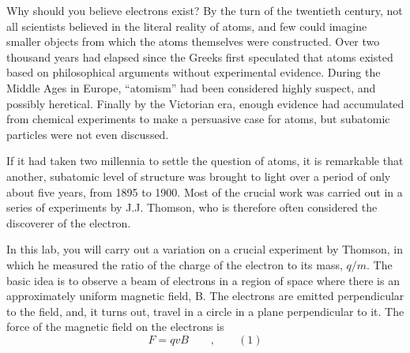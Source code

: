 \label{charge-to-mass}\label{lab:charge-to-mass}



\apparatus
{}


\introduction

Why should you believe electrons exist? By the turn of the
twentieth century, not all scientists believed in the
literal reality of atoms, and few could imagine smaller
objects from which the atoms themselves were constructed.
Over two thousand years had elapsed since the Greeks first
speculated that atoms existed based on philosophical
arguments without experimental evidence. During the Middle
Ages in Europe, ``atomism'' had been considered highly
suspect, and possibly heretical. Finally by the Victorian
era, enough evidence had accumulated from chemical
experiments to make a persuasive case for atoms, but
subatomic particles were not even discussed.

If it had taken two millennia to settle the question of
atoms, it is remarkable that another, subatomic level of
structure was brought to light over a period of only about
five years, from 1895 to 1900. Most of the crucial work was
carried out in a series of experiments by J.J. Thomson, who
is therefore often considered the discoverer of the electron.


In this lab, you will carry out a variation on a crucial
experiment by Thomson, in which he measured the ratio of the
charge of the electron to its mass, $q/m$. The basic idea is
to observe a beam of electrons in a region of space where
there is an approximately uniform magnetic field, B. The
electrons are emitted perpendicular to the field, and, it
turns out, travel in a circle in a plane perpendicular to
it. The force of the magnetic field on the electrons is
\begin{equation*}
      F  =  qvB \qquad ,  \qquad (1)  
\end{equation*}

